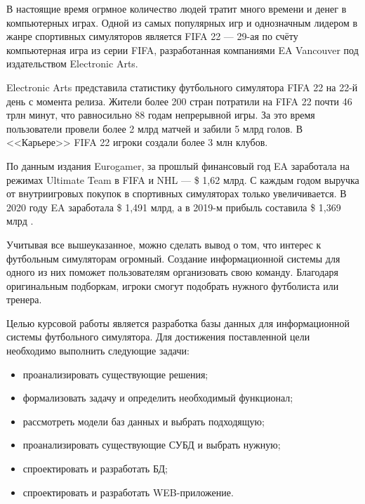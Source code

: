 \maketableofcontents

\intro

В настоящие время огрмное количество людей тратит много времени и денег в компьютерных играх. Одной из самых популярных игр и однозначным лидером в жанре спортивных симуляторов является FIFA 22 --- 29-ая по счёту компьютерная игра из серии FIFA, разработанная компаниями EA Vancouver под издательством Electronic Arts. 

Electronic Arts представила статистику футбольного симулятора FIFA 22 на 22-й день с момента релиза. Жители более 200 стран потратили на FIFA 22 почти 46 трлн минут, что равносильно 88 годам непрерывной игры. За это время пользователи провели более 2 млрд матчей и забили 5 млрд голов. В <<Карьере>> FIFA 22 игроки создали более 3 млн клубов.

По данным издания Eurogamer, за прошлый финансовый год EA заработала на режимах Ultimate Team в FIFA и NHL --- \$ 1,62 млрд. С каждым годом выручка от внутриигровых покупок в спортивных симуляторах только увеличивается. В 2020 году EA заработала \$ 1,491 млрд, а в 2019-м прибыль составила \$ 1,369 млрд \cite{autostat}.

Учитывая все вышеуказанное, можно сделать вывод о том, что интерес к футбольным симуляторам огромный. Создание информационной системы для одного из них поможет пользователям организовать свою команду. Благодаря оригинальным подборкам, игроки смогут подобрать нужного футболиста или тренера.

Целью курсовой работы является разработка базы данных для информационной системы футбольного симулятора. Для достижения поставленной цели необходимо выполнить следующие задачи:

\begin{itemize}
	\item проанализировать существующие решения;
	\item формализовать задачу и определить необходимый функционал;
	\item рассмотреть модели баз данных и выбрать подходящую;
	\item проанализировать существующие СУБД и выбрать нужную;
 	\item спроектировать и разработать БД;
    \item спроектировать и разработать WEB-приложение.
\end{itemize}
